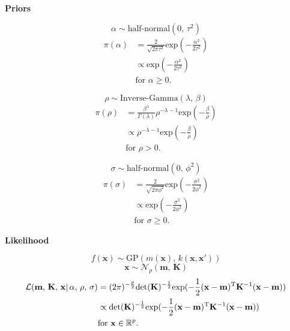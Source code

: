 \documentclass[a4paper, 10pt, fleqn]{article}
\begin{document}
\begin{flushleft}
         \textbf{Priors}

         \[\alpha \sim \text{half-normal}(0, \, \tau^2)\]
         \begin{align*}
            \pi(\alpha) 
            & = \frac{2}{\sqrt{2\pi\tau^2}} \text{exp}(-\frac{\alpha^2}{2\tau^2})\\
            & \propto \text{exp}(-\frac{\alpha^2}{2\tau^2})\\
            & \text{for } \alpha \geq 0.
         \end{align*}

         \[\rho \sim \text{Inverse-Gamma}(\lambda, \, \beta)\]
         \begin{align*}
            \pi(\rho)
            & = \frac{\beta^{\lambda}}{\Gamma(\lambda)} \rho^{-\lambda-1} \text{exp}(-\frac{\beta}{\rho})\\
            & \propto \rho^{-\lambda-1} \text{exp}(-\frac{\beta}{\rho})\\
            & \text{for } \rho > 0.
         \end{align*}

         \[\sigma \sim \text{half-normal}(0, \, \phi^2)\]
         \begin{align*}
            \pi(\sigma)
            & = \frac{2}{\sqrt{2\pi\phi^2}} \text{exp}(-\frac{\sigma^2}{2\phi^2})\\
            & \propto \text{exp}(-\frac{\sigma^2}{2\phi^2})\\
            & \text{for } \sigma \geq 0.
         \end{align*}

         \textbf{Likelihood}

         \[f(\mathbf{x}) \sim \text{GP}(m(\mathbf{x}) ,\, k(\mathbf{x}, \mathbf{x}'))\]
         \[\mathbf{x} \sim \mathcal{N}_{p}(\mathbf{m} ,\, \mathbf{K})\]
         \begin{align*}
            \mathcal{L}(\mathbf{m} ,\, \mathbf{K} ,\, \mathbf{x}| \, \alpha ,\, \rho ,\, \sigma)
            & = (2\pi)^{-\frac{p}{2}}\text{det}(\mathbf{K})^{-\frac{1}{2}} 
            \text{exp} (-\frac{1}{2} (\mathbf{x} - \mathbf{m})^{\text{\text{T}}} \mathbf{K}^{-1} (\mathbf{x} - \mathbf{m}))\\
            & \propto \text{det}(\mathbf{K})^{-\frac{1}{2}} 
            \text{exp} (-\frac{1}{2} (\mathbf{x} - \mathbf{m})^{\text{\text{T}}} \mathbf{K}^{-1} (\mathbf{x} - \mathbf{m}))\\
            & \text{for } \mathbf{x} \in \mathbb{R}^{p}.
         \end{align*}


\end{flushleft}
\end{document}
